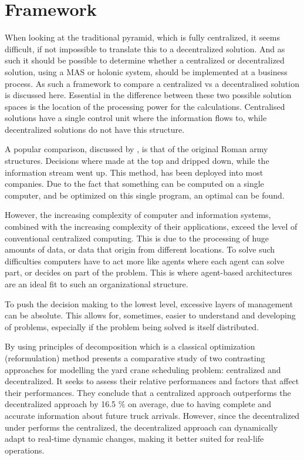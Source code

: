 \section{Framework}
When looking at the traditional pyramid, which is fully centralized, it seems difficult, if not impossible to translate this to a decentralized solution. And as such it should be possible to determine whether a centralized or decentralized solution, using a MAS or holonic system, should be implemented at a business process. As such a framework to compare a centralized vs a decentralised solution is discussed here. Essential in the difference between these two possible solution spaces is the location of the processing power for the calculations. Centralised solutions have a single control unit where the information flows to, while decentralized solutions do not have this structure.

A popular comparison, discussed by \citet{parunak1999industrial}, is that of the original Roman army structures. Decisions where made at the top and dripped down, while the information stream went up. This method, has been deployed into most companies. Due to the fact that something can be computed on a single computer, and be optimized on this single program, an optimal can be found.

However, the increasing complexity of computer and information systems, combined with the increasing complexity of their applications, exceed the level of conventional centralized computing. This is due to the processing of huge amounts of data, or data that origin from different locations. To solve such difficulties computers have to act more like agents where each agent can solve part, or decides on part of the problem. This is where agent-based architectures are an ideal fit to such an organizational structure.

To push the decision making to the lowest level, excessive layers of management can be absolute. This allows for, sometimes, easier to understand and developing of problems, especially if the problem being solved is itself distributed.

By using principles of decomposition which is a classical optimization (reformulation) method \citep{sharif2012yard} presents a comparative study of two contrasting approaches for modelling the yard crane scheduling problem: centralized and decentralized. It seeks to assess their relative performances and factors that affect their performances. They conclude that a centralized approach outperforms the decentralized approach by 16.5 \% on average, due to having complete and accurate information about future truck arrivals. However, since the decentralized under performs the centralized, the decentralized approach can dynamically adapt to real-time dynamic changes, making it better suited for real-life operations. 

